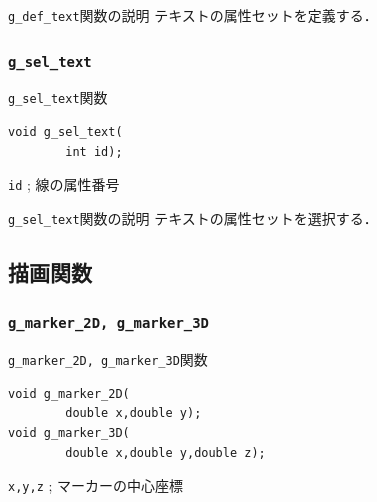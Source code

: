 \documentclass[a4paper,12pt]{jsarticle}%
\begin{document}
\begin{itembox}[l]{\texttt{g\_def\_text}関数の説明}
テキストの属性セットを定義する．
\end{itembox}

\subsubsection{\texttt{g\_sel\_text}}

\begin{itembox}[l]{\texttt{g\_sel\_text}関数}
\begin{verbatim}
void g_sel_text(
        int id);
\end{verbatim}
\verb|id| ; 線の属性番号\\
\end{itembox}

\begin{itembox}[l]{\texttt{g\_sel\_text}関数の説明}
テキストの属性セットを選択する．
\end{itembox}




\clearpage
\subsection{描画関数}

\subsubsection{\texttt{g\_marker\_2D, g\_marker\_3D}}

\begin{itembox}[l]{\texttt{g\_marker\_2D, g\_marker\_3D}関数}
\begin{verbatim}
void g_marker_2D(
        double x,double y);
void g_marker_3D(
        double x,double y,double z);	
\end{verbatim}
\verb|x,y,z| ; マーカーの中心座標\\
\end{itembox}
\end{document}
